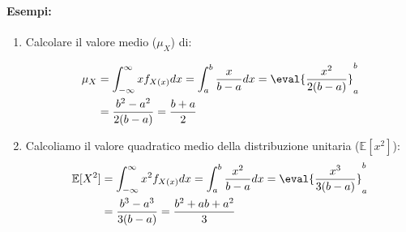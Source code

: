             \paragraph{Esempi:}\label{esempi expectation}
                \begin{enumerate}
                    \item{
                        Calcolare il valore medio ($\mu_X$) di:
                        \begin{figure}[H]
                            \centering
                        \end{figure}

                        \begin{align}
                            \mu_X &= \int_{-\infty}^{\infty}xf_{X(x)}dx = \int_{a}^{b}\frac{x}{b-a}dx = \eval{\frac{x^2}{2(b-a)}}_{a}^{b}\nonumber \\
                                  &= \frac{b^2-a^2}{2(b-a)} = \frac{b+a}{2}\nonumber 
                        \end{align}
                    }
                    \item{
                        Calcoliamo il valore quadratico medio della distribuzione unitaria ($\mathbb{E}[x^2]$):
                        \begin{align}
                            \mathbb{E}[X^2] &= \int_{-\infty}^{\infty}x^2f_{X(x)}dx = \int_{a}^{b}\frac{x^2}{b-a}dx = \eval{\frac{x^3}{3(b-a)}}_{a}^{b}\nonumber \\
                                            &= \frac{b^3-a^3}{3(b-a)} = \frac{b^2+ab+a^2}{3}\nonumber 
                        \end{align}
                    }
                \end{enumerate}
